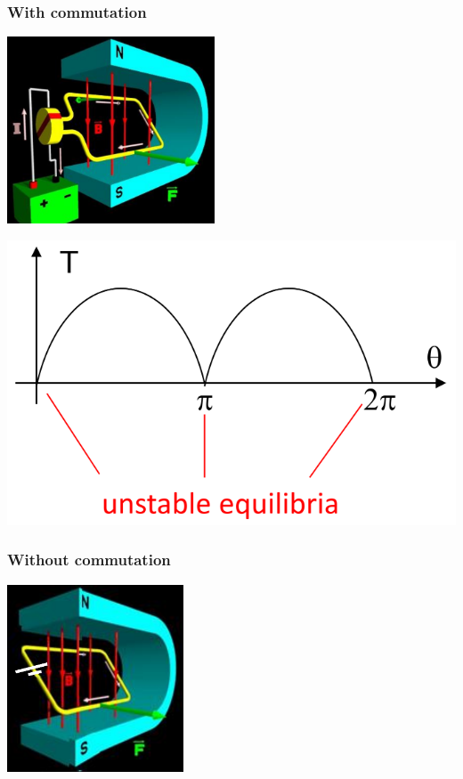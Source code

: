 \documentclass[11pt]{article}
\begin{document}
\subsubsection{With commutation}
\label{sec:orgb56f33f}
\begin{center}
\includegraphics[height=15em]{./images/dc-motor-structure.png}
\end{center}

\begin{center}
\includegraphics[width=.9\linewidth]{./images/dc-motor-with-commutation-graph.png}
\end{center}
\subsubsection{Without commutation}
\label{sec:org1a63de4}
\begin{center}
\includegraphics[height=15em]{./images/dc-motor-without-commutation-diagram.png}
\end{center}
\end{document}
